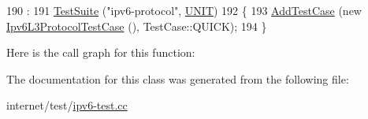 \begin{DoxyCode}
190                              :
191     \hyperlink{classns3_1_1TestSuite_a904b0c40583b744d30908aeb94636d1a}{TestSuite} (\textcolor{stringliteral}{"ipv6-protocol"}, \hyperlink{classns3_1_1TestSuite_a1ebfcab34ec8161e085e8e3a1855eae0a3885375a3787abf60431f8454b3cadbd}{UNIT})
192   \{
193     \hyperlink{classns3_1_1TestCase_a3718088e3eefd5d6454569d2e0ddd835}{AddTestCase} (\textcolor{keyword}{new} \hyperlink{classIpv6L3ProtocolTestCase}{Ipv6L3ProtocolTestCase} (), TestCase::QUICK);
194   \}
\end{DoxyCode}


Here is the call graph for this function\+:




The documentation for this class was generated from the following file\+:\begin{DoxyCompactItemize}
\item 
internet/test/\hyperlink{ipv6-test_8cc}{ipv6-\/test.\+cc}\end{DoxyCompactItemize}
